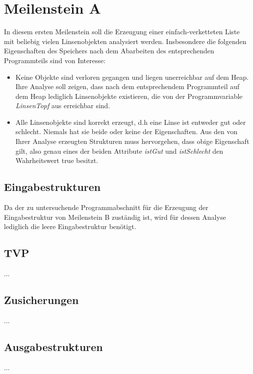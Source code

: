 \section{Meilenstein A}
In diesem ersten Meilenstein soll die Erzeugung einer einfach-verketteten Liste mit beliebig vielen Linsenobjekten analysiert werden. Insbesondere die folgenden Eigenschaften des Speichers nach dem Abarbeiten des entsprechenden Programmteils sind von Interesse:
\begin{itemize}
	\item Keine Objekte sind verloren gegangen und liegen unerreichbar auf dem Heap. Ihre Analyse soll zeigen, dass nach dem entsprechendem Programmteil auf dem Heap lediglich Linsenobjekte existieren, die von der Programmvariable \emph{LinsenTopf} aus erreichbar sind.
	\item Alle Linsenobjekte sind korrekt erzeugt, d.h eine Linse ist entweder gut oder schlecht. Niemals hat sie beide oder keine der Eigenschaften. Aus den von Ihrer Analyse erzeugten Strukturen muss hervorgehen, dass obige Eigenschaft gilt, also genau eines der beiden Attribute \emph{istGut} und \emph{istSchlecht} den Wahrheitswert true besitzt.
\end{itemize}


\subsection{Eingabestrukturen}
Da der zu untersuchende Programmabschnitt für die Erzeugung der Eingabestruktur von Meilenstein B zuständig ist, wird für dessen Analyse lediglich die leere Eingabestruktur benötigt. 


\subsection{TVP}
...


\subsection{Zusicherungen}
...


\subsection{Ausgabestrukturen}
...